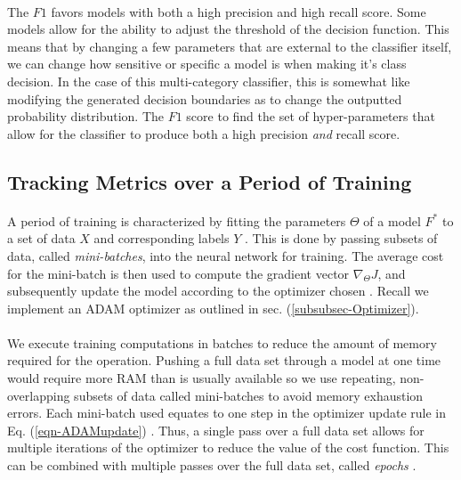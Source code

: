 \documentclass[12pt,letterpaper]{article}
\begin{document}
\paragraph*{}The $F1$ favors models with both a high precision and high recall score. Some models allow for the ability to adjust the threshold of the decision function. This means that by changing a few parameters that are external to the classifier itself, we can change how sensitive or specific a model is when making it's class decision. In the case of this multi-category classifier, this is somewhat like modifying the generated decision boundaries as to change the outputted probability distribution. The $F1$ score to find the set of hyper-parameters that allow for the classifier to produce both a high precision \textit{and} recall score.


\subsection{Tracking Metrics over a Period of Training}
\label{subsec-TrainingMetrics}

\paragraph*{}A period of training is characterized by fitting the parameters $\Theta$ of a model $F^*$ to a set of data $X$ and corresponding labels $Y$ \cite{Goodfellow,Virtanen}. This is done by passing subsets of data, called \textit{mini-batches}, into the neural network for training. The average cost for the mini-batch is then used to compute the gradient vector $\nabla_{\Theta}J$, and subsequently update the model according to the optimizer chosen \cite{Geron,Goodfellow}. Recall we implement an ADAM optimizer as outlined in sec. (\ref{subsubsec-Optimizer}).

\paragraph{}We execute training computations in batches to reduce the amount of memory required for the operation. Pushing a full data set through a model at one time would require more RAM than is usually available so we use repeating, non-overlapping subsets of data called mini-batches to avoid memory exhaustion errors. Each mini-batch used equates to one step in the optimizer update rule in Eq. (\ref{eqn-ADAMupdate}) \cite{Goodfellow}. Thus, a single pass over a full data set allows for multiple iterations of the optimizer to reduce the value of the cost function. This can be combined with multiple passes over the full data set, called \textit{epochs} \cite{James,Loy}.
\end{document}

